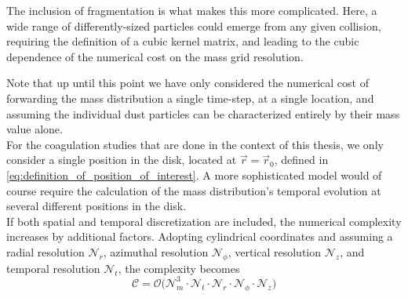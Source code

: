     The inclusion of fragmentation is what makes this more complicated. Here, a wide range of 
    differently-sized particles could emerge from any given collision, requiring the definition 
    of a cubic kernel matrix, and leading to the cubic dependence of the numerical cost on the mass 
    grid resolution.

    \clearpage

    Note that up until this point we have only considered the numerical cost of forwarding the mass 
    distribution a single time-step, at a single location, and assuming the individual dust 
    particles can be characterized entirely by their mass value alone. \\
    
    For the coagulation studies that are done in the context of this thesis, we only consider a 
    single position in the disk, located at $\vec r = \vec r_0$, defined in 
    \cref{eq:definition_of_position_of_interest}.
    A more sophisticated model would of course require the calculation of the mass distribution's 
    temporal evolution at several different positions in the disk. \\

    If both spatial and temporal discretization are included, the numerical complexity increases by 
    additional factors. 
    Adopting cylindrical coordinates and assuming a 
    radial    resolution $\mathcal N_r$, 
    azimuthal resolution $\mathcal N_\phi$, 
    vertical  resolution $\mathcal N_z$, and 
    temporal  resolution $\mathcal N_t$, 
    the complexity becomes
    \begin{equation}
        \mathcal C = \mathcal O\big( 
            \mathcal N_m^3 \cdot 
            \mathcal N_t \cdot 
            \mathcal N_r \cdot \mathcal N_\phi \cdot \mathcal N_z
        \big)
    \end{equation}



